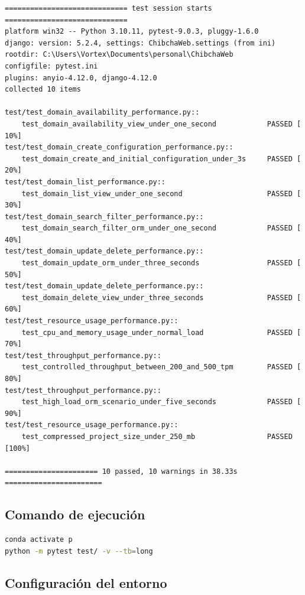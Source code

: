 \documentclass[12pt,a4paper]{article}
\begin{document}
\begin{lstlisting}[caption={Salida de ejecución de pytest},label={lst:pytest-output}]
============================= test session starts =============================
platform win32 -- Python 3.10.11, pytest-9.0.3, pluggy-1.6.0
django: version: 5.2.4, settings: ChibchaWeb.settings (from ini)
rootdir: C:\Users\Vortex\Documents\personal\ChibchaWeb
configfile: pytest.ini
plugins: anyio-4.12.0, django-4.12.0
collected 10 items

test/test_domain_availability_performance.py::
    test_domain_availability_view_under_one_second            PASSED [ 10%]
test/test_domain_create_configuration_performance.py::
    test_domain_create_and_initial_configuration_under_3s     PASSED [ 20%]
test/test_domain_list_performance.py::
    test_domain_list_view_under_one_second                    PASSED [ 30%]
test/test_domain_search_filter_performance.py::
    test_domain_search_filter_orm_under_one_second            PASSED [ 40%]
test/test_domain_update_delete_performance.py::
    test_domain_update_orm_under_three_seconds                PASSED [ 50%]
test/test_domain_update_delete_performance.py::
    test_domain_delete_view_under_three_seconds               PASSED [ 60%]
test/test_resource_usage_performance.py::
    test_cpu_and_memory_usage_under_normal_load               PASSED [ 70%]
test/test_throughput_performance.py::
    test_controlled_throughput_between_200_and_500_tpm        PASSED [ 80%]
test/test_throughput_performance.py::
    test_high_load_orm_scenario_under_five_seconds            PASSED [ 90%]
test/test_resource_usage_performance.py::
    test_compressed_project_size_under_250_mb                 PASSED [100%]

====================== 10 passed, 10 warnings in 38.33s =======================
\end{lstlisting}

\subsection{Comando de ejecución}

\begin{lstlisting}[language=bash,caption={Comando utilizado para ejecutar las pruebas}]
conda activate p
python -m pytest test/ -v --tb=long
\end{lstlisting}

\subsection{Configuración del entorno}
\end{document}
